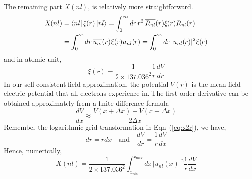 The remaining part $X(nl)$, is relatively more straightforward.
\begin{align} \label{eq:Xnlint}
X(nl) & = \Bra{nl}\xi(r)\Ket{nl} = \int_0^\infty dr\,r^2\, \overline{R_{nl}}(r) \xi(r) R_{nl}(r) \nonumber \\
& = \int_0^\infty dr\, \overline{u_{nl}}(r) \xi(r) u_{nl}(r) = \int_0^\infty dr\, |u_{nl}(r)|^2 \xi(r)
\end{align}
and in atomic unit,
\begin{equation}
\xi(r) = \frac{1}{2\times 137.036^2} \frac{1}{r} \frac{dV}{dr}
\end{equation}
%
In our self-consistent field approximation, the potential $V(r)$ is the mean-field
electric potential that all electrons experience in.
The first order derivative can be obtained approximately from a finite
difference formula
\begin{equation}
\frac{dV}{dx} \approx \frac{V(x+\Delta x)-V(x-\Delta x)}{2\Delta x}
\end{equation}
Remember the logarithmic grid transformation in Eqn~(\ref{eq:x2r}),
we have,
\begin{equation}
dr=rdx \quad \text{and} \quad \frac{dV}{dr} = \frac{1}{r} \frac{dV}{dx}
\end{equation}
%
Hence, numerically,
\begin{equation} \label{eq:Xnl}
X(nl) = \frac{1}{2\times 137.036^2} \int_{x_\text{min}}^{x_\text{max}} dx\, |u_{nl}(x)|^2 \frac{1}{r} \frac{dV}{dx}
\end{equation}

